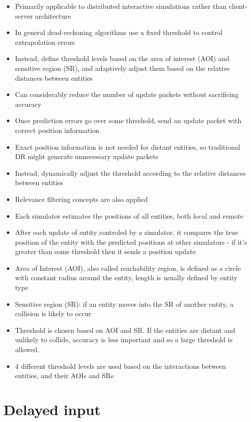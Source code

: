 \documentclass[conference]{IEEEtran}
\begin{document}
	\begin{itemize}
		\item Primarily applicable to distributed interactive simulations rather than client-server architecture
		\item In general dead-reckoning algorithms use a fixed threshold to control extrapolation errors
		\item Instead, define threshold levels based on the area of interest (AOI) and sensitive region (SR), and adaptively adjust them based on the relative distances between entities
		\item Can considerably reduce the number of update packets without sacrificing accuracy
		\item Once prediction errors go over some threshold, send an update packet with correct position information
		\item Exact position information is not needed for distant entities, so traditional DR might generate unnecessary update packets
		\item Instead, dynamically adjust the threshold according to the relative distances between entities
		\item Relevance filtering concepts are also applied
		\item Each simulator estimates the positions of all entities, both local and remote
		\item After each update of entity controled by a simulator, it compares the true position of the entity with the predicted positions at other simulators - if it's greater than some threshold then it sends a position update
		\item Area of Interest (AOI), also called reachability region, is defined as a circle with constant radius around the entity, length is usually defined by entity type
		\item Sensitive region (SR): if an entity moves into the SR of another entity, a collision is likely to occur
		\item Threshold is chosen based on AOI and SR. If the entities are distant and unlikely to collide, accuracy is less important and so a large threshold is allowed.
		\item 4 different threshold levels are used based on the interactions between entities, and their AOIs and SRs
	\end{itemize}

	\section{Delayed input}
\end{document}
